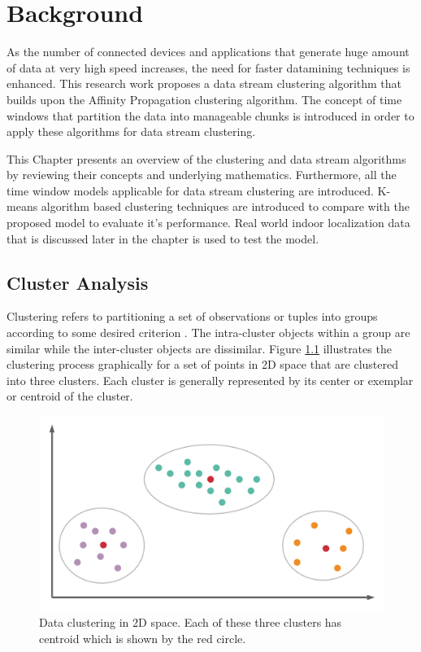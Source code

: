 \documentclass[../UNBThesis2.tex]{subfiles}
\begin{document}
\chapter{Background}

As the number of connected devices and applications that generate huge amount of data at very high speed increases, the need for faster datamining techniques is enhanced. This research work proposes a data stream clustering algorithm that builds upon the Affinity Propagation clustering algorithm. The concept of time windows that partition the data into manageable chunks is introduced in order to apply these algorithms for data stream clustering.

This Chapter presents an overview of the clustering and data stream algorithms by reviewing their concepts and underlying mathematics. Furthermore, all the time window models applicable for data stream clustering are introduced. K-means algorithm based clustering techniques are introduced to compare with the proposed model to evaluate it's performance. Real world indoor localization data that is discussed later in the chapter is used to test the model. 


\section{Cluster Analysis}

Clustering refers to partitioning a set of observations or tuples into groups according to some desired criterion \cite{jain1999data}. The intra-cluster objects within a group are similar while the inter-cluster objects are dissimilar. Figure \ref{clus} illustrates the clustering process graphically for a set of points in 2D space that are clustered into three clusters. Each cluster is generally represented by its center or exemplar or centroid of the cluster.

\begin{figure}[!h]
    \centering
    \includegraphics[width = 10 cm]{image/Chapters/Chapter2/Blank diagram (1).png}
    \caption{Data clustering in 2D space. Each of these three clusters has centroid which is shown by the red circle. }
    \label{clus}
\end{figure}
\end{document}
